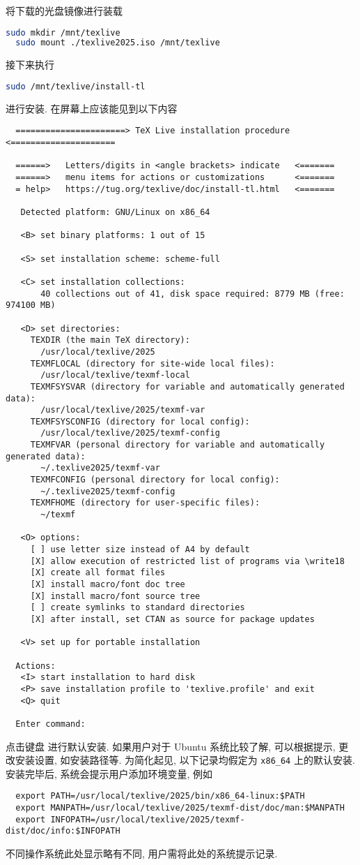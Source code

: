 将下载的光盘镜像进行装载
\begin{lstlisting}[language = bash]
  sudo mkdir /mnt/texlive
  sudo mount ./texlive2025.iso /mnt/texlive
\end{lstlisting}
接下来执行
\begin{lstlisting}[language = bash]
  sudo /mnt/texlive/install-tl
\end{lstlisting}
进行安装.
在屏幕上应该能见到以下内容
\begin{lstlisting}
  ======================> TeX Live installation procedure <=====================

  ======>   Letters/digits in <angle brackets> indicate   <=======
  ======>   menu items for actions or customizations      <=======
  = help>   https://tug.org/texlive/doc/install-tl.html   <=======

   Detected platform: GNU/Linux on x86_64

   <B> set binary platforms: 1 out of 15

   <S> set installation scheme: scheme-full

   <C> set installation collections:
       40 collections out of 41, disk space required: 8779 MB (free: 974100 MB)

   <D> set directories:
     TEXDIR (the main TeX directory):
       /usr/local/texlive/2025
     TEXMFLOCAL (directory for site-wide local files):
       /usr/local/texlive/texmf-local
     TEXMFSYSVAR (directory for variable and automatically generated data):
       /usr/local/texlive/2025/texmf-var
     TEXMFSYSCONFIG (directory for local config):
       /usr/local/texlive/2025/texmf-config
     TEXMFVAR (personal directory for variable and automatically generated data):
       ~/.texlive2025/texmf-var
     TEXMFCONFIG (personal directory for local config):
       ~/.texlive2025/texmf-config
     TEXMFHOME (directory for user-specific files):
       ~/texmf

   <O> options:
     [ ] use letter size instead of A4 by default
     [X] allow execution of restricted list of programs via \write18
     [X] create all format files
     [X] install macro/font doc tree
     [X] install macro/font source tree
     [ ] create symlinks to standard directories
     [X] after install, set CTAN as source for package updates

   <V> set up for portable installation

  Actions:
   <I> start installation to hard disk
   <P> save installation profile to 'texlive.profile' and exit
   <Q> quit

  Enter command:
\end{lstlisting}
点击键盘  进行默认安装.
如果用户对于 Ubuntu 系统比较了解,
可以根据提示,
更改安装设置,
如安装路径等.
为简化起见,
以下记录均假定为 \texttt{x86\_64} 上的默认安装.
安装完毕后,
系统会提示用户添加环境变量,
例如
\begin{lstlisting}
  export PATH=/usr/local/texlive/2025/bin/x86_64-linux:$PATH
  export MANPATH=/usr/local/texlive/2025/texmf-dist/doc/man:$MANPATH
  export INFOPATH=/usr/local/texlive/2025/texmf-dist/doc/info:$INFOPATH
\end{lstlisting}
不同操作系统此处显示略有不同,
用户需将此处的系统提示记录.

